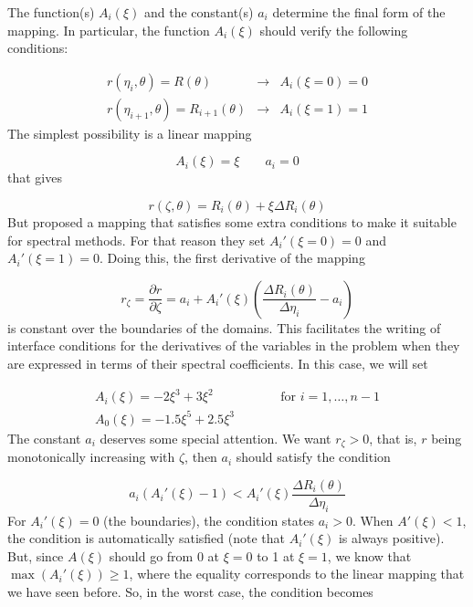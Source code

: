 The function(s) $A_i(\xi)$ and the constant(s) $a_i$ determine the final
form of the mapping. In particular, the function $A_i(\xi)$ should verify
the following conditions:

\begin{eqnarray*}
r(\eta_i,\theta)=R(\theta) &\longrightarrow& A_i(\xi=0)=0\\
r(\eta_{i+1},\theta)=R_{i+1}(\theta) &\longrightarrow& A_i(\xi=1)=1
\end{eqnarray*}
The simplest possibility is a linear mapping

\begin{equation}
A_i(\xi)=\xi \qquad a_i=0
\end{equation}
that gives

\begin{equation}
\label{eq:map_linear}
r(\zeta,\theta)=R_i(\theta)+\xi\Delta R_i(\theta)
\end{equation}
But \citet{BGM98} proposed a mapping that satisfies some
extra conditions to make it suitable for spectral methods. For that
reason they set $A_i'(\xi=0)=0$ and $A_i'(\xi=1)=0$. Doing this, the
first derivative of the mapping

\begin{equation}
r_\zeta=\frac{\partial r}{\partial\zeta}=a_i+A_i'(\xi)\left(\frac{\Delta R_i(\theta)}{\Delta\eta_i}-a_i\right)
\end{equation}
is constant over the boundaries of the domains. This facilitates the
writing of interface conditions for the derivatives of the variables
in the problem when they are expressed in terms of their spectral
coefficients.  In this case, we will set

\begin{eqnarray}
\label{eq:map_bonazzola}
A_i(\xi)=-2\xi^3+3\xi^2 &\qquad& \mbox{for $i=1,\ldots,n-1$}\\
A_0(\xi)=-1.5\xi^5+2.5\xi^3&&
\end{eqnarray}
The constant $a_i$ deserves some special attention. We want $r_\zeta>0$,
that is, $r$ being monotonically increasing with $\zeta$, then $a_i$
should satisfy the condition

\begin{equation}
a_i(A_i'(\xi)-1)<A_i'(\xi)\frac{\Delta R_i(\theta)}{\Delta\eta_i}
\end{equation}
For $A_i'(\xi)=0$ (the boundaries), the condition states $a_i>0$.
When $A'(\xi)<1$, the condition is automatically satisfied (note that
$A_i'(\xi)$ is always positive).  But, since $A(\xi)$ should go from 0 at
$\xi=0$ to 1 at $\xi=1$, we know that $\max(A_i'(\xi))\ge1$, where the
equality corresponds to the linear mapping that we have seen before. So,
in the worst case, the condition becomes

